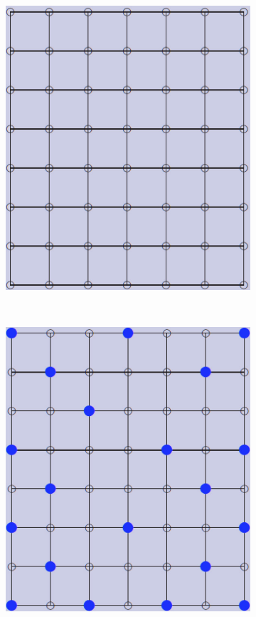 \documentclass[12pt]{article}
\begin{document}
\begin{figure}[tb]
  \centering
  \begin{subfigure}[b]{0.2\textwidth}
      \includegraphics[width=\textwidth]{img/contract_kernel2}
      \caption{}\label{fig:contract_kernel1}
  \end{subfigure}~%
  \begin{subfigure}[b]{0.2\textwidth}
      \includegraphics[width=\textwidth]{img/contract_kernel3}

\end{subfigure}
\end{figure}
\end{document}
